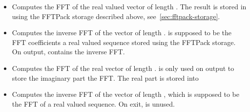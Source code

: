 \begin{itemize}
\item {}
  \sshortdescribe Computes the FFT of the real valued vector  of
  length . The result is stored in  using the FFTPack storage
  described above, see~\ref{sec:fftpack-storage}.

\item {}
  \sshortdescribe Computes the inverse FFT of the vector  of length
  .  is supposed to be the FFT coefficients a real valued
  sequence stored using the FFTPack storage. On output,  contains
  the inverse FFT.

\item {}
  \sshortdescribe Computes the FFT of the real vector  of length .
   is only used on output to store the imaginary part the FFT. The
  real part is stored into 
  
\item {}
  \sshortdescribe Computes the inverse FFT of the vector  of
  length , which is supposed to be the FFT of a real valued
  sequence. On exit,  is unused. 
\end{itemize}




